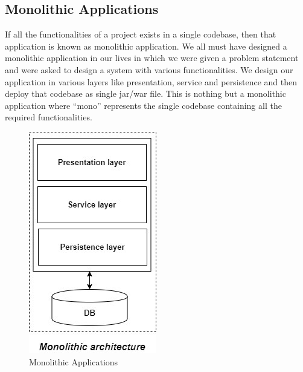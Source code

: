 \subsection{Monolithic Applications}

If all the functionalities of a project exists in a single codebase, then that application is known as monolithic application. We all must have designed a monolithic application in our lives in which we were given a problem statement and were asked to design a system with various functionalities. We design our application in various layers like presentation, service and persistence and then deploy that codebase as single jar/war file. This is nothing but a monolithic application where “mono” represents the single codebase containing all the required functionalities.
\begin{figure}[!ht]
      \center
      \includegraphics[scale=0.60]{assets/monolithic.jpg}
      \caption{Monolithic Applications}
      \label{fig:monoapp}
\end{figure}

